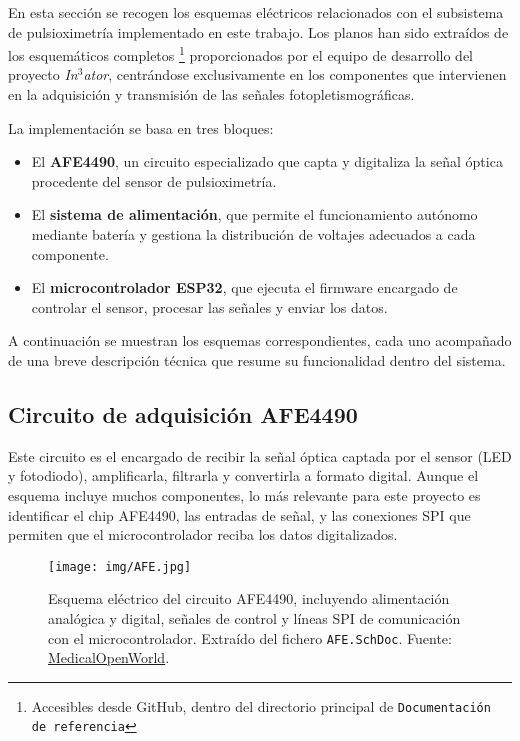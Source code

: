 En esta sección se recogen los esquemas eléctricos relacionados con el subsistema de pulsioximetría implementado en este trabajo. Los planos han sido extraídos de los esquemáticos completos \footnote{Accesibles desde GitHub, dentro del directorio principal de \texttt{Documentación de referencia}} proporcionados por el equipo de desarrollo del proyecto \textit{In$^3$ator}, centrándose exclusivamente en los componentes que intervienen en la adquisición y transmisión de las señales fotopletismográficas.

La implementación se basa en tres bloques:
\begin{itemize}
    \item El \textbf{AFE4490}, un circuito especializado que capta y digitaliza la señal óptica procedente del sensor de pulsioximetría.
    \item El \textbf{sistema de alimentación}, que permite el funcionamiento autónomo mediante batería y gestiona la distribución de voltajes adecuados a cada componente.
    \item El \textbf{microcontrolador ESP32}, que ejecuta el firmware encargado de controlar el sensor, procesar las señales y enviar los datos.
\end{itemize}

A continuación se muestran los esquemas correspondientes, cada uno acompañado de una breve descripción técnica que resume su funcionalidad dentro del sistema.
\subsection{Circuito de adquisición AFE4490}

Este circuito es el encargado de recibir la se\~nal \'optica captada por el sensor (LED y fotodiodo), amplificarla, filtrarla y convertirla a formato digital. Aunque el esquema incluye muchos componentes, lo m\'as relevante para este proyecto es identificar el chip AFE4490, las entradas de se\~nal, y las conexiones SPI que permiten que el microcontrolador reciba los datos digitalizados.

\begin{figure}[H]
\centering
\texttt{[image: img/AFE.jpg]}
\caption{Esquema eléctrico del circuito AFE4490, incluyendo alimentación analógica y digital, señales de control y líneas SPI de comunicación con el microcontrolador. Extraído del fichero \texttt{AFE.SchDoc}. Fuente: \href{https://medicalopenworld.org/}{MedicalOpenWorld}.}
\end{figure}

